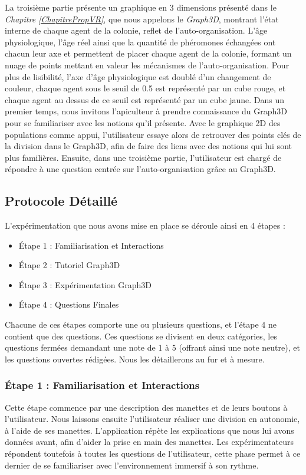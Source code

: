     La troisième partie présente un graphique en 3 dimensions présenté dans le \textit{Chapitre \ref{ChapitrePropVR}}, que nous appelons le \textit{Graph3D}, montrant l'état interne de chaque agent de la colonie, reflet de l'auto-organisation. L'âge physiologique, l'âge réel ainsi que la quantité de phéromones échangées ont chacun leur axe et permettent de placer chaque agent de la colonie, formant un nuage de points mettant en valeur les mécanismes de l'auto-organisation. Pour plus de lisibilité, l'axe d'âge physiologique est doublé d'un changement de couleur, chaque agent sous le seuil de 0.5 est représenté par un cube rouge, et chaque agent au dessus de ce seuil est représenté par un cube jaune. Dans un premier temps, nous invitons l'apiculteur à prendre connaissance du Graph3D pour se familiariser avec les notions qu'il présente. Avec le graphique 2D des populations comme appui, l'utilisateur essaye alors de retrouver des points clés de la division dans le Graph3D, afin de faire des liens avec des notions qui lui sont plus familières. Ensuite, dans une troisième partie, l'utilisateur est chargé de répondre à une question centrée sur l'auto-organisation grâce au Graph3D.

		
		\subsection{Protocole Détaillé}
		
		L'expérimentation que nous avons mise en place se déroule ainsi en 4 étapes :
		\begin{itemize}
			\item Étape 1 : Familiarisation et Interactions
			\item Étape 2 : Tutoriel Graph3D
			\item Étape 3 : Expérimentation Graph3D
			\item Étape 4 : Questions Finales
		\end{itemize}
		Chacune de ces étapes comporte une ou plusieurs questions, et l'étape 4 ne contient que des questions. Ces questions se divisent en deux catégories, les questions fermées demandant une note de 1 à 5 (offrant ainsi une note neutre), et les questions ouvertes rédigées. Nous les détaillerons au fur et à mesure.
		
		\subsubsection{Étape 1 : Familiarisation et Interactions}
		Cette étape commence par une description des manettes et de leurs boutons à l'utilisateur. Nous laissons ensuite l'utilisateur réaliser une division en autonomie, à l'aide de ses manettes. L'application répète les explications que nous lui avons données avant, afin d'aider la prise en main des manettes. Les expérimentateurs répondent toutefois à toutes les questions de l'utilisateur, cette phase permet à ce dernier de se familiariser avec l'environnement immersif à son rythme.
		

